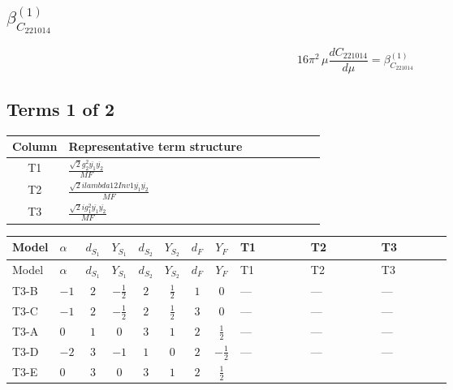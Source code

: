 \documentclass[8pt]{article}
\begin{document}
\begin{landscape}
\section*{$\beta_{C_{221014}}^{(1)}$}
\[16\pi^2\,\mu\frac{d C_{221014}}{d\mu}=\beta_{C_{221014}}^{(1)}\]
\subsection*{Terms 1 of 2}
\begin{center}
\begin{tabular}{@{}c >{\raggedright\arraybackslash}p{0.82\linewidth}@{}}
\toprule
Column & Representative term structure \\
\midrule
T1 & \(\displaystyle \frac{\sqrt{2} g_{2}^{2} \overline{y_{1}} \overline{y_{2}}}{MF}\) \\
\midrule
T2 & \(\displaystyle \frac{\sqrt{2} i lambda12Inv1 \overline{y_{1}} \overline{y_{2}}}{MF}\) \\
\midrule
T3 & \(\displaystyle \frac{\sqrt{2} i g_{1}^{2} \overline{y_{1}} \overline{y_{2}}}{MF}\) \\
\midrule
\bottomrule
\end{tabular}
\end{center}
\smallskip
\tiny
\begin{longtable}{@{}llcccccc >{\raggedright\arraybackslash}p{0.21\linewidth} >{\raggedright\arraybackslash}p{0.21\linewidth} >{\raggedright\arraybackslash}p{0.21\linewidth}@{}}
\toprule
Model & $\alpha$ & $d_{S_1}$ & $Y_{S_1}$ & $d_{S_2}$ & $Y_{S_2}$ & $d_F$ & $Y_F$ & T1 & T2 & T3 \\
\midrule
\endfirsthead
\toprule
Model & $\alpha$ & $d_{S_1}$ & $Y_{S_1}$ & $d_{S_2}$ & $Y_{S_2}$ & $d_F$ & $Y_F$ & T1 & T2 & T3 \\
\midrule
\endhead
T3-B & $-1$ & $2$ & $-\frac{1}{2}$ & $2$ & $\frac{1}{2}$ & $1$ & $0$ & --- & --- & --- \\
\midrule
T3-C & $-1$ & $2$ & $-\frac{1}{2}$ & $2$ & $\frac{1}{2}$ & $3$ & $0$ & --- & --- & --- \\
\midrule
T3-A & $0$ & $1$ & $0$ & $3$ & $1$ & $2$ & $\frac{1}{2}$ & --- & --- & --- \\
\midrule
T3-D & $-2$ & $3$ & $-1$ & $1$ & $0$ & $2$ & $-\frac{1}{2}$ & --- & --- & --- \\
\midrule
T3-E & $0$ & $3$ & $0$ & $3$ & $1$ & $2$ & $\frac{1}{2}$ & \scriptsize\adjustbox{max width=\linewidth}{$\begin{gathered} - \frac{\sqrt{2} g_{2}^{2} \overline{y_{1}} \overline{y_{2}}}{4 MF}\end{gathered}$} & \scriptsize\adjustbox{max width=\linewidth}{$\begin{gathered} - \frac{\sqrt{2} i lambda12Inv1 \overline{y_{1}} \overline{y_{2}}}{4 MF}\end{gathered}$} & \scriptsize\adjustbox{max width=\linewidth}{$\begin{gathered} \frac{3 \sqrt{2} i g_{1}^{2} \overline{y_{1}} \overline{y_{2}}}{16 MF}\end{gathered}$} \\
\midrule
\bottomrule
\end{longtable}
\clearpage

\end{landscape}
\end{document}
